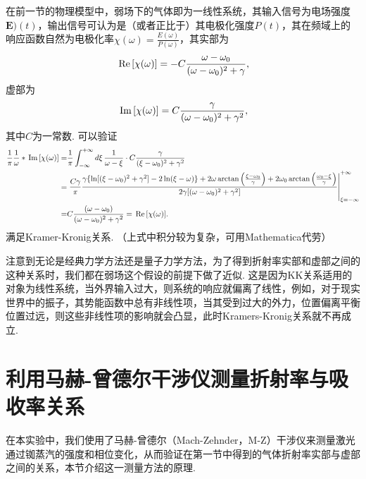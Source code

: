 \documentclass{assignment}
\begin{document}
在前一节的物理模型中，弱场下的气体即为一线性系统，其输入信号为电场强度$\bm{E})(t)$，输出信号可认为是（或者正比于）其电极化强度$P(t)$，其在频域上的响应函数自然为电极化率$\chi(\omega)=\frac{E(\omega)}{P(\omega)}$，其实部为
\begin{align}
    \,\text{Re}\,[\chi(\omega)]=-C\frac{\omega-\omega_0}{(\omega-\omega_0)^2+\gamma},
\end{align}
虚部为
\begin{align}
    \,\text{Im}\,[\chi(\omega)]=C\frac{\gamma}{(\omega-\omega_0)^2+\gamma^2},
\end{align}
其中$C$为一常数.
可以验证
\begin{align}
    \notag\frac{1}{\pi}\frac{1}{\omega}*\,\text{Im}\,[\chi(\omega)]=&\frac{1}{\pi}\int_{-\infty}^{+\infty}d\xi\,\frac{1}{\omega-\xi}\cdot C\frac{\gamma}{(\xi-\omega_0)^2+\gamma^2}\\
    \notag=&\left.\frac{C\gamma}{\pi}\frac{\gamma\{\ln[(\xi-\omega_0)^2+\gamma^2]-2\ln(\xi-\omega)\}+2\omega\arctan\left(\frac{\xi-\omega_0}{\gamma}\right)+2\omega_0\arctan\left(\frac{\omega_0-\xi}{\gamma}\right)}{2\gamma[(\omega-\omega_0)^2+\gamma^2]}\right\vert_{\xi=-\infty}^{+\infty}\\
    =&C\frac{(\omega-\omega_0)}{(\omega-\omega_0)^2+\gamma^2}=\,\text{Re}\,[\chi(\omega)].
\end{align}
满足Kramer-Kronig关系.
（上式中积分较为复杂，可用Mathematica代劳）

注意到无论是经典力学方法还是量子力学方法，为了得到折射率实部和虚部之间的这种关系时，我们都在弱场这个假设的前提下做了近似. 这是因为KK关系适用的对象为线性系统，当外界输入过大，则系统的响应就偏离了线性，例如，对于现实世界中的振子，其势能函数中总有非线性项，当其受到过大的外力，位置偏离平衡位置过远，则这些非线性项的影响就会凸显，此时Kramers-Kronig关系就不再成立.

\section{利用马赫-曾德尔干涉仪测量折射率与吸收率关系}
在本实验中，我们使用了马赫-曾德尔（Mach-Zehnder，M-Z）干涉仪来测量激光通过铷蒸汽的强度和相位变化，从而验证在第一节中得到的气体折射率实部与虚部之间的关系，本节介绍这一测量方法的原理.
\end{document}
